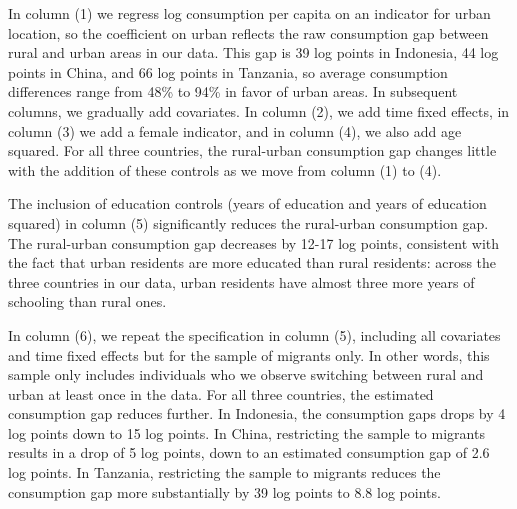 \documentclass[12pt]{article}
\begin{document}
In column (1) we regress log consumption per capita on an indicator for urban location, so the coefficient on urban reflects the raw consumption gap between rural and urban areas in our data. 
This gap is 39 log points in Indonesia, 44 log points in China, and 66 log points in Tanzania, so average consumption differences range from 48\% to 94\% in favor of urban areas.
In subsequent columns, we gradually add covariates.  
In column (2), we add time fixed effects, in column (3) we add a female indicator, and in column (4), we also add age squared. 
For all three countries, the rural-urban consumption gap changes little with the addition of these controls as we move from column (1) to (4). 

The inclusion of education controls (years of education and years of education squared) in column (5) significantly reduces the rural-urban consumption gap.
The rural-urban consumption gap decreases by 12-17 log points, consistent with the fact that urban residents are more educated than rural residents: 
across the three countries in our data, urban residents have almost three more years of schooling than rural ones.


In column (6), we repeat the specification in column (5), including all covariates and time fixed effects but for the sample of migrants only.
In other words, this sample only includes individuals who we observe switching between rural and urban at least once in the data.
For all three countries, the estimated consumption gap reduces further. 
In Indonesia, the consumption gaps drops by 4 log points down to 15 log points.
In China, restricting the sample to migrants results in a drop of 5 log points, down to an estimated consumption gap of 2.6 log points.
In Tanzania, restricting the sample to migrants reduces the consumption gap more substantially by 39 log points to 8.8 log points.
\end{document}
